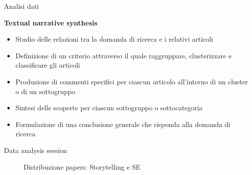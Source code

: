 \documentclass{beamer}
\begin{document}
\begin{frame}[t]{\centerline{Analisi dati}}

  \centering
  {\fontsize{16}{22}\textbf{\textcolor{myyellow}{Textual narrative synthesis  \cite{Lucas2007}}}}
\vspace{1cm}
  \begin{itemize}
      \item Studio delle relazioni tra la domanda di ricerca e i relativi articoli
\item Definizione di un criterio attraverso il quale raggruppare, clusterizzare e classificare gli articoli
\item Produzione di commenti specifici per ciascun articolo all'interno di un cluster o di un sottogruppo
\item Sintesi delle scoperte per ciascun sottogruppo o sottocategoria
\item Formulazione di una conclusione generale che risponda alla domanda di ricerca
  \end{itemize}


\end{frame}
\begin{frame}[t]{\centerline{Data analysis session}}
\begin{figure}[htbp]
    \centering
    \caption{Distribuzione papers: Storytelling e SE}
    \label{fig:distribution}
\end{figure}
\end{frame}
\end{document}
